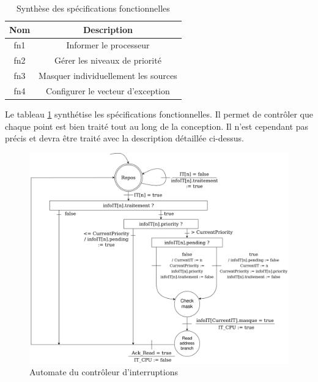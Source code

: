 \begin{table}[H]
	\centering
	\begin{tabular}{|c|c|}
		\hline
		Nom & Description                          \\ \hline
		fn1 & Informer le processeur               \\ \hline
		fn2 & Gérer les niveaux de priorité        \\ \hline
		fn3 & Masquer individuellement les sources \\ \hline
		fn4 & Configurer le vecteur d'exception    \\ \hline
	\end{tabular}
	\caption{Synthèse des spécifications fonctionnelles}
	\label{tab:spe_funct}
\end{table}

Le tableau \ref{tab:spe_funct} synthétise les spécifications fonctionnelles.
Il permet de contrôler que chaque point est bien traité tout au long de la conception.
Il n'est cependant pas précis et devra être traité avec la description détaillée ci-dessus.

\begin{figure}[H]
	\centering
	\includegraphics[width=1\linewidth]{figure/spec_fonc_1.png}
	\caption{Automate du contrôleur d'interruptions}
	\label{fig:spec_func_1}
\end{figure}

